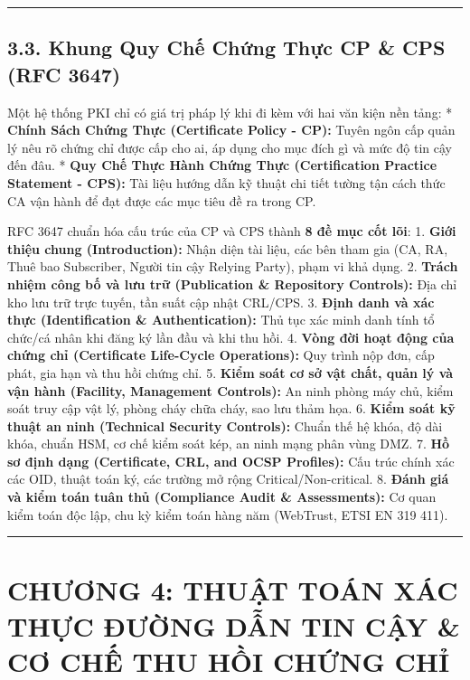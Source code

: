 \documentclass[
]{article}
\begin{document}
\begin{center}\rule{0.5\linewidth}{0.5pt}\end{center}

\subsection{3.3. Khung Quy Chế Chứng Thực CP \& CPS (RFC
3647)}\label{khung-quy-chux1ebf-chux1ee9ng-thux1ef1c-cp-cps-rfc-3647}

Một hệ thống PKI chỉ có giá trị pháp lý khi đi kèm với hai văn kiện nền
tảng: * \textbf{Chính Sách Chứng Thực (Certificate Policy - CP):} Tuyên
ngôn cấp quản lý nêu rõ chứng chỉ được cấp cho ai, áp dụng cho mục đích
gì và mức độ tin cậy đến đâu. * \textbf{Quy Chế Thực Hành Chứng Thực
(Certification Practice Statement - CPS):} Tài liệu hướng dẫn kỹ thuật
chi tiết tường tận cách thức CA vận hành để đạt được các mục tiêu đề ra
trong CP.

RFC 3647 chuẩn hóa cấu trúc của CP và CPS thành \textbf{8 đề mục cốt
lõi}: 1. \textbf{Giới thiệu chung (Introduction):} Nhận diện tài liệu,
các bên tham gia (CA, RA, Thuê bao Subscriber, Người tin cậy Relying
Party), phạm vi khả dụng. 2. \textbf{Trách nhiệm công bố và lưu trữ
(Publication \& Repository Controls):} Địa chỉ kho lưu trữ trực tuyến,
tần suất cập nhật CRL/CPS. 3. \textbf{Định danh và xác thực
(Identification \& Authentication):} Thủ tục xác minh danh tính tổ
chức/cá nhân khi đăng ký lần đầu và khi thu hồi. 4. \textbf{Vòng đời
hoạt động của chứng chỉ (Certificate Life-Cycle Operations):} Quy trình
nộp đơn, cấp phát, gia hạn và thu hồi chứng chỉ. 5. \textbf{Kiểm soát cơ
sở vật chất, quản lý và vận hành (Facility, Management Controls):} An
ninh phòng máy chủ, kiểm soát truy cập vật lý, phòng cháy chữa cháy, sao
lưu thảm họa. 6. \textbf{Kiểm soát kỹ thuật an ninh (Technical Security
Controls):} Chuẩn thế hệ khóa, độ dài khóa, chuẩn HSM, cơ chế kiểm soát
kép, an ninh mạng phân vùng DMZ. 7. \textbf{Hồ sơ định dạng
(Certificate, CRL, and OCSP Profiles):} Cấu trúc chính xác các OID,
thuật toán ký, các trường mở rộng Critical/Non-critical. 8. \textbf{Đánh
giá và kiểm toán tuân thủ (Compliance Audit \& Assessments):} Cơ quan
kiểm toán độc lập, chu kỳ kiểm toán hàng năm (WebTrust, ETSI EN 319
411).

\begin{center}\rule{0.5\linewidth}{0.5pt}\end{center}

\section{CHƯƠNG 4: THUẬT TOÁN XÁC THỰC ĐƯỜNG DẪN TIN CẬY \& CƠ CHẾ THU
HỒI CHỨNG
CHỈ}\label{chux1b0ux1a1ng-4-thuux1eadt-touxe1n-xuxe1c-thux1ef1c-ux111ux1b0ux1eddng-dux1eabn-tin-cux1eady-cux1a1-chux1ebf-thu-hux1ed3i-chux1ee9ng-chux1ec9}
\end{document}
